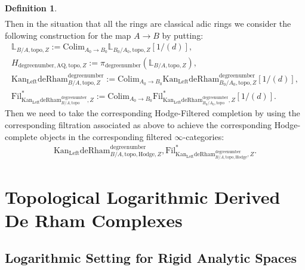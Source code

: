 \documentclass[11pt]{book}
\theoremstyle{definition}
\newtheorem{definition}[theorem]{Definition}
\numberwithin{equation}{section}
\begin{document}
\begin{definition}
\begin{align}
\end{align}
Then in the situation that all the rings are classical adic rings we consider the following construction for the map $A\rightarrow B$ by putting:
\begin{align}
\mathbb{L}_{B/A,\mathrm{topo},Z}:= \mathrm{Colim}_{A_0\rightarrow B_0}\mathbb{L}_{B_0/A_0,\mathrm{topo},Z}[1/(d)],\\
H_{\text{degreenumber},{\mathrm{AQ}},\mathrm{topo},Z}:=\pi_\text{degreenumber} (\mathbb{L}_{B/A,\mathrm{topo},Z}),	\\
\mathrm{Kan}_\mathrm{Left}\mathrm{deRham}^\text{degreenumber}_{B/A,\mathrm{topo},Z}:=\mathrm{Colim}_{A_0\rightarrow B_0}\mathrm{Kan}_\mathrm{Left}\mathrm{deRham}^\text{degreenumber}_{B_0/A_0,\mathrm{topo},Z}[1/(d)],\\
\mathrm{Fil}^*_{\mathrm{Kan}_\mathrm{Left}\mathrm{deRham}^\text{degreenumber}_{B/A,\mathrm{topo}},Z}:=\mathrm{Colim}_{A_0\rightarrow B_0}\mathrm{Fil}^*_{\mathrm{Kan}_\mathrm{Left}\mathrm{deRham}^\text{degreenumber}_{B_0/A_0,\mathrm{topo}},Z}[1/(d)].
\end{align}
Then we need to take the corresponding Hodge-Filtered completion by using the corresponding filtration associated as above to achieve the corresponding Hodge-complete objects in the corresponding filtered $\infty$-categories:
\begin{align}
\mathrm{Kan}_\mathrm{Left}{\mathrm{deRham}}^\text{degreenumber}_{B/A,\mathrm{topo,Hodge},Z},\mathrm{Fil}^*_{\mathrm{Kan}_\mathrm{Left}{\mathrm{deRham}}^\text{degreenumber}_{B/A,\mathrm{topo,Hodge}},Z}.	
\end{align} 	
\end{definition}







\newpage


\section{Topological Logarithmic Derived De Rham Complexes}



\subsection{Logarithmic Setting for Rigid Analytic Spaces}


\end{document}
